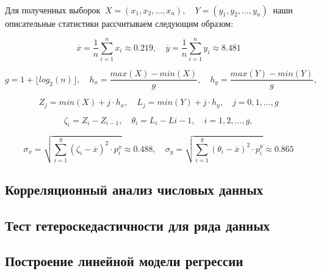 \documentclass[
]{article}
\begin{document}
\(\ \)

Для полученных выборок
\(\ X = (x_1, x_2, \dots, x_n), \quad Y = (y_1, y_2, \dots, y_n)\ \)
наши описательные статистики рассчитываем следующим образом:

\[
\overline{x} = \frac{1}{n} \sum \limits_{i=1}^{n} x_i \approx 0.219, \quad \overline{y} = \frac{1}{n} \sum \limits_{i=1}^{n} y_i \approx 8.481
\]

\[
g = 1 + \lfloor log_2(n)\rfloor, \quad  h_x = \frac{max(X) - min(X)}{g}, \quad h_y = \frac{max(Y) - min(Y)}{g},
\]

\[
Z_j = min(X) + j \cdot h_x,\quad L_j = min(Y) + j \cdot h_y, \quad  j=0, 1, \dots, g 
\]

\[
\zeta_i = Z_{i} - Z_{i-1},\quad \theta_i = L_i - L{i-1}, \quad i=1,2,\dots, g,
\]

\[
\sigma_x = \sqrt{\sum\limits_{i = 1}^{g} (\zeta_i - \overline{x})^2 \cdot p^x_i} \approx 0.488, \quad 
\sigma_y = \sqrt{\sum\limits_{i = 1}^{g} (\theta_i - \overline{x})^2 \cdot p^y_i} \approx 0.865
\]

\hypertarget{ux43aux43eux440ux440ux435ux43bux44fux446ux438ux43eux43dux43dux44bux439-ux430ux43dux430ux43bux438ux437-ux447ux438ux441ux43bux43eux432ux44bux445-ux434ux430ux43dux43dux44bux445}{%
\subsection{\texorpdfstring{\textbf{Корреляционный анализ числовых
данных}}{Корреляционный анализ числовых данных}}\label{ux43aux43eux440ux440ux435ux43bux44fux446ux438ux43eux43dux43dux44bux439-ux430ux43dux430ux43bux438ux437-ux447ux438ux441ux43bux43eux432ux44bux445-ux434ux430ux43dux43dux44bux445}}

\hypertarget{ux442ux435ux441ux442-ux433ux435ux442ux435ux440ux43eux441ux43aux435ux434ux430ux441ux442ux438ux447ux43dux43eux441ux442ux438-ux434ux43bux44f-ux440ux44fux434ux430-ux434ux430ux43dux43dux44bux445}{%
\subsection{\texorpdfstring{\textbf{Тест гетероскедастичности для ряда
данных}}{Тест гетероскедастичности для ряда данных}}\label{ux442ux435ux441ux442-ux433ux435ux442ux435ux440ux43eux441ux43aux435ux434ux430ux441ux442ux438ux447ux43dux43eux441ux442ux438-ux434ux43bux44f-ux440ux44fux434ux430-ux434ux430ux43dux43dux44bux445}}

\hypertarget{ux43fux43eux441ux442ux440ux43eux435ux43dux438ux435-ux43bux438ux43dux435ux439ux43dux43eux439-ux43cux43eux434ux435ux43bux438-ux440ux435ux433ux440ux435ux441ux441ux438ux438}{%
\subsection{\texorpdfstring{\textbf{Построение линейной модели
регрессии}}{Построение линейной модели регрессии}}\label{ux43fux43eux441ux442ux440ux43eux435ux43dux438ux435-ux43bux438ux43dux435ux439ux43dux43eux439-ux43cux43eux434ux435ux43bux438-ux440ux435ux433ux440ux435ux441ux441ux438ux438}}
\end{document}
